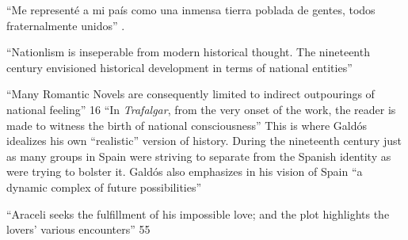 \documentclass[12pt]{article}
\title{}
\makeatletter
\newcommand\iraggedright{%
	\let\\\@centercr\@rightskip\@flushglue \rightskip\@rightskip
	\leftskip\z@skip}
\makeatother
\begin{document}
	\makeheader
	\iraggedright
	
	\enquote{Me representé a mi país como una inmensa tierra poblada de gentes, todos fraternalmente unidos} \cite[?]{Galdós, trafalgar}.
	
	\enquote{Nationlism is inseperable from modern historical thought. The nineteenth century envisioned historical development in terms of national entities} \cite[15]{Rodriguez1967}
	
	\enquote{Many Romantic Novels are consequently limited to indirect outpourings of national feeling} 16
	\enquote{In \textit{Trafalgar}, from the very onset of the work, the reader is made to witness the birth of national consciousness}
	This is where Galdós idealizes his own \enquote{realistic} version of history. During the nineteenth century just as many groups in Spain were striving to separate from the Spanish identity as were trying to bolster it.
	Galdós also emphasizes in his vision of Spain \enquote{a dynamic complex of future possibilities} \cite[17]{Rodriguez1967}
	
	
	\enquote{Araceli seeks the fulfillment of his impossible love; and the plot highlights the lovers' various encounters} 55
	
	


\makeworkscited
\listoftodos
\end{document}
